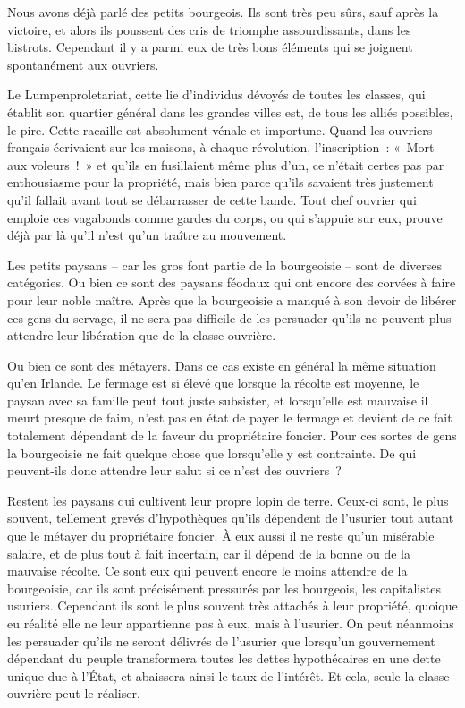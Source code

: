 \documentclass[french,twoside]{book} %
\begin{document}
Nous avons déjà parlé des petits bourgeois. Ils sont très peu sûrs, sauf après la victoire, et alors ils poussent des cris de triomphe assourdissants, dans les bistrots. Cependant il y a parmi eux de très bons éléments qui se joignent spontanément aux ouvriers.\par
Le Lumpenproletariat, cette lie d’individus dévoyés de toutes les classes, qui établit son quartier général dans les grandes villes est, de tous les alliés possibles, le pire. Cette racaille est absolument vénale et importune. Quand les ouvriers français écrivaient sur les maisons, à chaque révolution, l’inscription : « Mort aux voleurs ! » et qu’ils en fusillaient même plus d’un, ce n’était certes pas par enthousiasme pour la propriété, mais bien parce qu’ils savaient très justement qu’il fallait avant tout se débarrasser de cette bande. Tout chef ouvrier qui emploie ces vagabonds comme gardes du corps, ou qui s’appuie sur eux, prouve déjà par là qu’il n’est qu’un traître au mouvement.\par
Les petits paysans – car les gros font partie de la bourgeoisie – sont de diverses catégories. Ou bien ce sont des paysans féodaux qui ont encore des corvées à faire pour leur noble maître. Après que la bourgeoisie a manqué à son devoir de libérer ces gens du servage, il ne sera pas difficile de les persuader qu’ils ne peuvent plus attendre leur libération que de la classe ouvrière.\par
Ou bien ce sont des métayers. Dans ce cas existe en général la même situation qu’en Irlande. Le fermage est si élevé que lorsque la récolte est moyenne, le paysan avec sa famille peut tout juste subsister, et lorsqu’elle est mauvaise il meurt presque de faim, n’est pas en état de payer le fermage et devient de ce fait totalement dépendant de la faveur du propriétaire foncier. Pour ces sortes de gens la bourgeoisie ne fait quelque chose que lorsqu’elle y est contrainte. De qui peuvent-ils donc attendre leur salut si ce n’est des ouvriers ?\par
Restent les paysans qui cultivent leur propre lopin de terre. Ceux-ci sont, le plus souvent, tellement grevés d’hypothèques qu’ils dépendent de l’usurier tout autant que le métayer du propriétaire foncier. À eux aussi il ne reste qu’un misérable salaire, et de plus tout à fait incertain, car il dépend de la bonne ou de la mauvaise récolte. Ce sont eux qui peuvent encore le moins attendre de la bourgeoisie, car ils sont précisément pressurés par les bourgeois, les capitalistes usuriers. Cependant ils sont le plus souvent très attachés à leur propriété, quoique eu réalité elle ne leur appartienne pas à eux, mais à l’usurier. On peut néanmoins les persuader qu’ils ne seront délivrés de l’usurier que lorsqu’un gouvernement dépendant du peuple transformera toutes les dettes hypothécaires en une dette unique due à l’État, et abaissera ainsi le taux de l’intérêt. Et cela, seule la classe ouvrière peut le réaliser.\par
\end{document}
